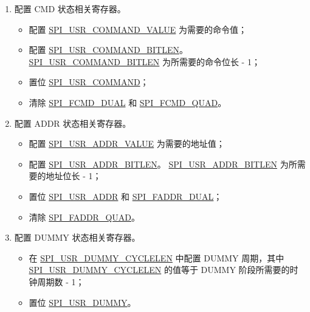 \documentclass[main\_\_CN.tex]{subfiles}
\begin{document}
\begin{enumerate}
    \item 配置 CMD 状态相关寄存器。
        \begin{itemize}
            \item 配置  \hyperref[fielddesc:SPIUSRCOMMANDVALUE]{SPI\_USR\_COMMAND\_VALUE} 为需要的命令值；
            \item 配置  \hyperref[fielddesc:SPIUSRCOMMANDBITLEN]{SPI\_USR\_COMMAND\_BITLEN}。\hyperref[fielddesc:SPIUSRCOMMANDBITLEN]{SPI\_USR\_COMMAND\_BITLEN} 为所需要的命令位长 - 1；
            \item 置位  \hyperref[fielddesc:SPIUSRCOMMAND]{SPI\_USR\_COMMAND}；
            \item 清除  \hyperref[fielddesc:SPIFCMDDUAL]{SPI\_FCMD\_DUAL} 和  \hyperref[fielddesc:SPIFCMDQUAD]{SPI\_FCMD\_QUAD}。
        \end{itemize}

    \item 配置 ADDR 状态相关寄存器。
        \begin{itemize}
            \item 配置  \hyperref[fielddesc:SPIUSRADDRVALUE]{SPI\_USR\_ADDR\_VALUE} 为需要的地址值；
            \item 配置  \hyperref[fielddesc:SPIUSRADDRBITLEN]{SPI\_USR\_ADDR\_BITLEN}。 \hyperref[fielddesc:SPIUSRADDRBITLEN]{SPI\_USR\_ADDR\_BITLEN} 为所需要的地址位长 - 1；
            \item 置位  \hyperref[fielddesc:SPIUSRADDR]{SPI\_USR\_ADDR} 和  \hyperref[fielddesc:SPIFADDRDUAL]{SPI\_FADDR\_DUAL}；
            \item 清除  \hyperref[fielddesc:SPIFADDRQUAD]{SPI\_FADDR\_QUAD}。
        \end{itemize}

    \item 配置 DUMMY 状态相关寄存器。
        \begin{itemize}
            \item 在  \hyperref[fielddesc:SPIUSRDUMMYCYCLELEN]{SPI\_USR\_DUMMY\_CYCLELEN} 中配置 DUMMY 周期，其中  \hyperref[fielddesc:SPIUSRDUMMYCYCLELEN]{SPI\_USR\_DUMMY\_CYCLELEN} 的值等于 DUMMY 阶段所需要的时钟周期数 - 1；
            \item 置位  \hyperref[fielddesc:SPIUSRDUMMY]{SPI\_USR\_DUMMY}。
        \end{itemize}


\end{enumerate}
\end{document}

